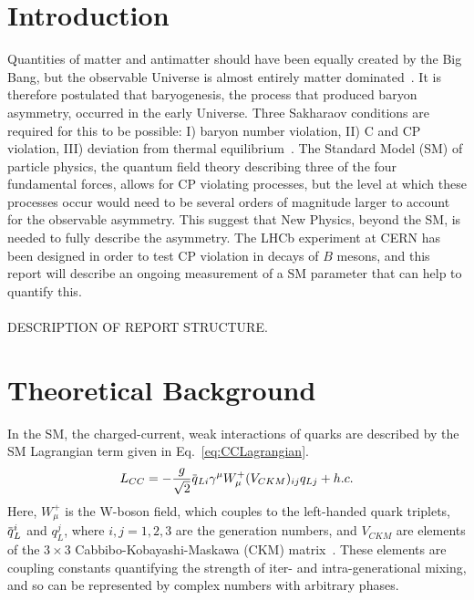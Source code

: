 \documentclass[oneside,12pt]{article}
\newcommand{\overbar}[1]{\mkern 1.5mu\overline{\mkern-1.5mu#1\mkern-1.5mu}\mkern
1.5mu}
\begin{document}
\section{\normalsize Introduction}
Quantities of matter and antimatter should have been equally created by the Big
Bang, but the observable Universe is almost entirely matter
dominated~\cite{UniAsymmetry}. It is therefore postulated that baryogenesis, the
process that produced baryon asymmetry, occurred in the early Universe. Three
Sakharaov conditions are required for this to be possible: I) baryon number
violation, II) C and CP violation, III) deviation from thermal
equilibrium~\cite{Sakharov}. The Standard Model (SM) of particle physics, the
quantum field theory describing three of the four fundamental forces, allows for
CP violating processes, but the level at which these processes occur would need
to be several orders of magnitude larger to account for the observable
asymmetry. This suggest that New Physics, beyond the SM, is needed to fully
describe the asymmetry. The LHCb experiment at CERN has been designed in order
to test CP violation in decays of $B$ mesons, and this report will describe an
ongoing measurement of a SM parameter that can help to quantify this. \\ 
\\
DESCRIPTION OF REPORT STRUCTURE.
\section{\normalsize Theoretical Background}
In the SM, the charged-current, weak interactions of quarks are described by the
SM Lagrangian term given in Eq.~\eqref{eq:CCLagrangian}.
\begin{equation}
  L_{CC}=-\frac{g}{\sqrt{2}}\overbar{q}_{Li}\gamma^{\mu}W_{\mu}^{+}(V_{CKM})_{ij}q_{Lj}
  + h.c.  
  \label{eq:CCLagrangian}
\end{equation}
\noindent Here, $W_{\mu}^{+}$ is the W-boson field, which couples to the
left-handed quark triplets, $\overbar{q}_{L}^{i}$ and $q_{L}^{j}$, where
$i,j=1,2,3$ are the generation numbers, and $V_{CKM}$ are elements of the
$3\times 3$ Cabbibo-Kobayashi-Maskawa (CKM) matrix~\cite{CKMTheory}. These
elements are coupling constants quantifying the strength of iter- and
intra-generational mixing, and so can be represented by complex numbers with
arbitrary phases.
\end{document}
